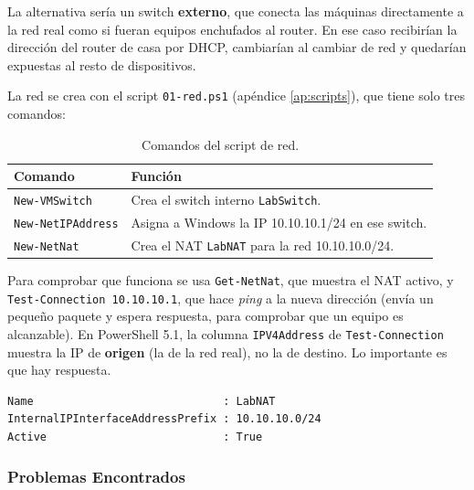 \documentclass[11pt, a4paper, titlepage]{article}
\newcommand{\cod}[1]{\texttt{#1}}
\begin{document}
La alternativa sería un switch \textbf{externo}, que conecta las máquinas directamente a la red real como si fueran equipos enchufados al router. En ese caso recibirían la dirección del router de casa por DHCP, cambiarían al cambiar de red y quedarían expuestas al resto de dispositivos.

La red se crea con el script \cod{01-red.ps1} (apéndice \ref{ap:scripts}), que tiene solo tres comandos:

\begin{table}[H]
\centering
\small
\begin{tabular}{lp{10cm}}
\toprule
\textbf{Comando} & \textbf{Función} \\
\midrule
\cod{New-VMSwitch} & Crea el switch interno \cod{LabSwitch}. \\
\cod{New-NetIPAddress} & Asigna a Windows la IP 10.10.10.1/24 en ese switch. \\
\cod{New-NetNat} & Crea el NAT \cod{LabNAT} para la red 10.10.10.0/24. \\
\bottomrule
\end{tabular}
\caption{Comandos del script de red.}
\label{tab:red}
\end{table}

Para comprobar que funciona se usa \cod{Get-NetNat}, que muestra el NAT activo, y \cod{Test-Connection 10.10.10.1}, que hace \textit{ping} a la nueva dirección (envía un pequeño paquete y espera respuesta, para comprobar que un equipo es alcanzable). En PowerShell 5.1, la columna \cod{IPV4Address} de \cod{Test-Connection} muestra la IP de \textbf{origen} (la de la red real), no la de destino. Lo importante es que hay respuesta.

\begin{lstlisting}[style=salida]
Name                             : LabNAT
InternalIPInterfaceAddressPrefix : 10.10.10.0/24
Active                           : True
\end{lstlisting}

\subsubsection{Problemas Encontrados}
\end{document}
